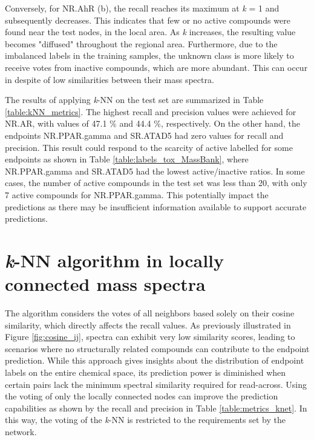 Conversely, for NR.AhR (b), the recall reaches its maximum at \textit{k} = 1 and subsequently decreases. This indicates that few or no active compounds were found near the test nodes, in the local area. As \textit{k} increases, the resulting value becomes "diffused" throughout the regional area. Furthermore, due to the imbalanced labels in the training samples, the unknown class is more likely to receive votes from inactive compounds, which are more abundant. This can occur in despite of low similarities between their mass spectra.

The results of applying \textit{k}-NN on the test set are summarized in Table \ref{table:kNN_metrics}. The highest recall and precision values were achieved for NR.AR, with values of 47.1 \% and 44.4 \%, respectively. On the other hand, the endpoints NR.PPAR.gamma and SR.ATAD5 had zero values for recall and precision. This result could respond to the scarcity of active labelled for some endpoints as shown in Table \ref{table:labels_tox_MassBank}, where NR.PPAR.gamma and SR.ATAD5 had the lowest active/inactive ratios.  In some cases, the number of active compounds in the test set was less than 20, with only 7 active compounds for NR.PPAR.gamma. This potentially impact the predictions as there may be insufficient information available to support accurate predictions. 

\section*{\textit{k}-NN algorithm in locally connected mass spectra}

The \kNN{} algorithm considers the votes of all neighbors based solely on their cosine similarity, which directly affects the recall values. As previously illustrated in Figure \ref{fig:cosine_ij}, spectra can exhibit very low similarity scores, leading to scenarios where no structurally related compounds can contribute to the endpoint prediction. While this approach gives insights about the distribution of endpoint labels on the entire chemical space, its prediction power is diminished when certain pairs lack the minimum spectral similarity required for read-across. Using the voting of only the locally connected nodes can improve the prediction capabilities as shown by the recall and precision in Table \ref{table:metrics_knet}. In this way, the voting of the \textit{k}-NN is restricted to the requirements set by the network. 

